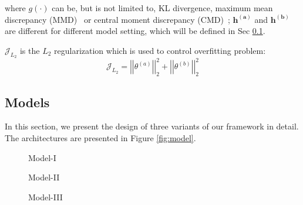 \noindent where $g(\cdot)$ can be, but is not limited to, 
KL divergence, maximum mean discrepancy 
(MMD)~\cite{Gretton:2012:KTT:2188385.2188410} or central moment discrepancy 
(CMD)~\cite{DBLP:journals/corr/ZellingerGLNS17}; $\mathbf{h^{(a)}}$ and $\mathbf{h^{(b)}}$ are different for different model setting, which will be defined in Sec \ref{sec:models}.

$\mathcal{J}_{L_2}$ is the $L_2$ regularization which is used to control overfitting problem:
\small
\begin{equation}
\mathcal{J}_{L_2} = \left|\left|\theta^{(a)}\right|\right|^2_2 + \left|\left|\theta^{(b)}\right|\right|^2_2
\end{equation}
\normalsize

\subsection{Models}\label{sec:models}


In this section, we present the design of three variants of our framework in detail. The architectures are presented in Figure \ref{fig:model}.

\begin{figure*}[ht!]
\begin{subfigure}{.33\textwidth}
\def\svgwidth{\textwidth}

\caption{Model-\RN{1}}\label{fig:model_1}
\end{subfigure}
\begin{subfigure}{.33\textwidth}
\def\svgwidth{\textwidth}

\caption{Model-\RN{2}}\label{fig:model_2}
\end{subfigure}
\begin{subfigure}{.33\textwidth}
\def\svgwidth{\textwidth}

\caption{Model-\RN{3}}\label{fig:model_3}
\end{subfigure}
\caption{Three models with different settings. The white block represents Embedding lookup layer, while the gray and black block represents Bi-LSTM layer. The ``SHARED'' in Figure \ref{fig:model_2} stands for shared Bi-LSTM for both tasks. The ``$\mathcal{J}_\textnormal{Adap.}$'' represents \textit{Adaptive} loss for the hidden representation after corresponding layer, which is formally discussed in Sec \ref{sec:objective}. The solid arrow and dotted arrow show the flow of task $a$ and task $b$ respectively.}\label{fig:model}
\end{figure*}

